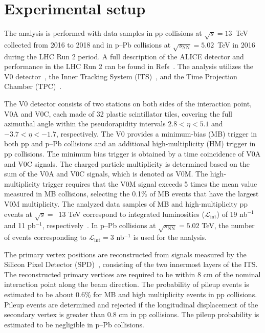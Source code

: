 

\section{Experimental setup}
\label{sec:experiment}

The analysis is performed with data samples in pp collisions at $\sqrt{s} = 13$~TeV collected from 2016 to 2018 and in p--Pb collisions at $\sqrt{s_\mathrm{NN}} = 5.02$~TeV in 2016 during the LHC Run 2 period. A full description of the ALICE detector and performance in the LHC Run 2 can be found in Refs~\cite{Aamodt:2008zz,Abelev:2014ffa}. The analysis utilizes the V0 detector~\cite{Abbas:2013taa}, the Inner Tracking System (ITS)~\cite{aliceITS}, and the Time Projection Chamber (TPC)~\cite{aliceTPC}. 

The V0 detector consists of two stations on both sides of the interaction point, V0A and V0C, each made of 32 plastic scintillator tiles, covering the full azimuthal angle within the pseudorapidity intervals $2.8 < \eta < 5.1$ and $-3.7 < \eta < -1.7$, respectively. The V0 provides a minimum-bias (MB) trigger in both pp and p--Pb collisions and an additional high-multiplicity (HM) trigger in pp collisions. The minimum bias trigger is obtained by a time coincidence of V0A and V0C signals. The charged particle multiplicity is determined based on the sum of the V0A and V0C signals, which is denoted as V0M. The high-multiplicity trigger requires that the V0M signal exceeds 5 times the mean value measured in MB collisions, selecting the 0.1\% of MB events that have the largest V0M multiplicity. The analyzed data samples of MB and high-multiplicity pp events at $\sqrt{s}=$~13 TeV correspond to integrated luminosities ($\mathcal{L}_\mathrm{int}$) of 19 nb$^{-1}$ and 11 pb$^{-1}$, respectively~\cite{ALICE-PUBLIC-2016-002}. In p--Pb collisions at $\sqrt{s_\mathrm{NN}} = 5.02$ TeV, the number of events corresponding to $\mathcal{L}_\mathrm{int} = 3$ nb$^{-1}$ is used for the analysis. 

The primary vertex positions are reconstructed from signals measured by the Silicon Pixel Detector (SPD)~\cite{Santoro2009:ALICESPD}, consisting of the two innermost layers of the ITS. The reconstructed primary vertices are required to be within 8 cm of the nominal interaction point along the beam direction. The probability of pileup events is estimated to be about 0.6\% for MB and high multiplicity events in pp collisions. Pileup events are determined and rejected if the longitudinal displacement of the secondary vertex is greater than 0.8 cm in pp collisions. The pileup probability is estimated to be negligible in p--Pb collisions. 


